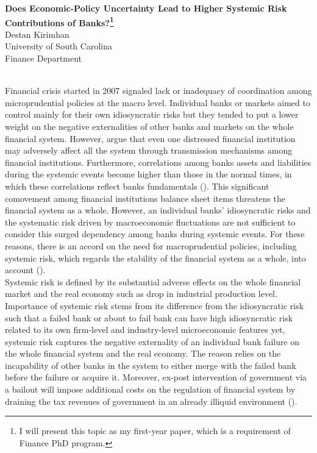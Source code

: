 \documentclass[11pt, oneside]{article}   	%
\begin{document}
	\begin{center}
		\Large\textbf{Does Economic-Policy Uncertainty Lead to Higher Systemic Risk Contributions of Banks?\footnote{I will present this topic as my first-year paper, which is a requirement of Finance PhD program.}}\\
		\large{Destan Kirimhan}\\
		\large{University of South Carolina}\\
		\large{Finance Department}	
			\author{Destan} %
	\end{center}
\\
Financial crisis started in 2007 signaled lack or inadequacy of coordination among microprudential policies at the macro level. Individual banks or markets aimed to control mainly for their own idiosyncratic risks but they tended to put a lower weight on the negative externalities of other banks and markets on the whole financial system. However, \cite{debandt2015} argue that even one distressed financial institution may adversely affect all the system through transmission mechanisms among financial institutions. Furthermore, correlations among banks\textsc{} assets and liabilities during the systemic events become higher than those in the normal times, in which these correlations reflect banks\textsc{} fundamentals (\cite{adrianbrunnermeier2009}). This significant comovement among financial institutions\textsc{} balance sheet items threatens the financial system as a whole. However, an individual banks’ idiosyncratic risks and the systematic risk driven by macroeconomic fluctuations are not sufficient to consider this surged dependency among banks during systemic events. For these reasons, there is an accord on the need for macroprudential policies, including systemic risk, which regards the stability of the financial system as a whole, into account (\cite{adrianbrunnermeier2009,borio2003}). \\
Systemic risk is defined by its substantial adverse effects on the whole financial market and the real economy such as drop in industrial production level. Importance of systemic risk stems from its difference from the idiosyncratic risk such that a failed bank or about to fail bank can have high idiosyncratic risk related to its own firm-level and industry-level microeconomic features yet, systemic risk captures the negative externality of an individual bank failure on the whole financial system and the real economy. The reason relies on the incapability of other banks in the system to either merge with the failed bank before the failure or acquire it. Moreover, ex-post intervention of government via a bailout will impose additional costs on the regulation of financial system by draining the tax revenues of government in an already illiquid environment (\cite{brownleesengle2015}). \\
\end{document}
